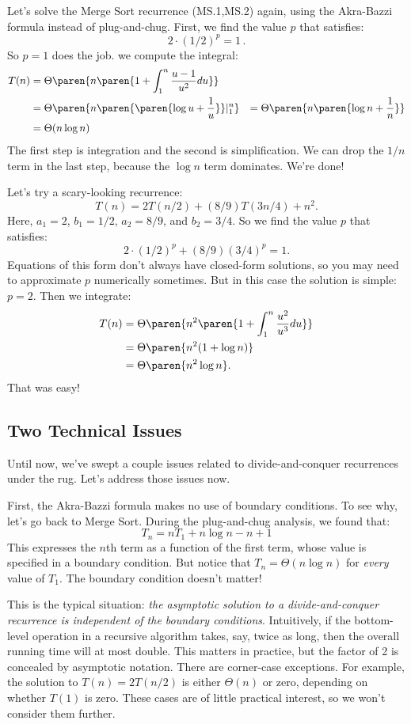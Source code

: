 Let's solve the Merge Sort recurrence (MS.1,MS.2) again, using the
Akra-Bazzi formula instead of plug-and-chug.  First, we find the value
$p$ that satisfies:
\[
2 \cdot (1/2)^p = 1\, .
\]
So $p = 1$ does the job.  
we compute the integral:
\begin{align*}
T(n) & = \Theta\paren{n \paren{1 + \int_1^n \frac{u - 1}{u^2} du}} \\
  & = \Theta\paren{n\paren{\paren{\log u + \frac{1}{u}}}|_1^n}
  & = \Theta\paren{n \paren{\log n + \frac{1}{n}}} \\
  & = \Theta(n\log n)
\end{align*}
The first step is integration and the second is simplification.  We
can drop the $1/n$ term in the last step, because the $\log n$ term
dominates.  We're done!

Let's try a scary-looking recurrence:
\[
T(n) = 2T(n/2) + (8/9)T(3n/4) + n^2.
\]
Here, $a_1 = 2$, $b_1 = 1/2$, $a_2 = 8/9$, and $b_2 = 3/4$.  So we
find the value $p$ that satisfies:
\[
2 \cdot (1/2)^p + (8/9) (3/4)^p = 1.
\]
Equations of this form don't always have closed-form solutions, so you
may need to approximate $p$ numerically sometimes.  But in this case
the solution is simple: $p = 2$.  Then we integrate:
\begin{align*}
T(n) & = \Theta\paren{n^2 \paren{1 + \int_1^n \frac{u^2}{u^3} du}} \\
  & = \Theta\paren{n^2 (1 + \log n)} \\
  & = \Theta\paren{n^2 \log n}.
\end{align*}
That was easy!

\subsection{Two Technical Issues}

Until now, we've swept a couple issues related to divide-and-conquer
recurrences under the rug.  Let's address those issues now.

First, the Akra-Bazzi formula makes no use of boundary conditions.  To
see why, let's go back to Merge Sort.  During the plug-and-chug
analysis, we found that:
\[
T_n = n T_1 + n \log n - n + 1
\]
This expresses the $n$th term as a function of the first term, whose
value is specified in a boundary condition.  But notice that $T_n =
\Theta(n \log n)$ for \emph{every} value of $T_1$.  The boundary
condition doesn't matter!

This is the typical situation: \emph{the asymptotic solution to a
  divide-and-conquer recurrence is independent of the boundary
  conditions}.  Intuitively, if the bottom-level operation in a
recursive algorithm takes, say, twice as long, then the overall
running time will at most double.  This matters in practice, but the
factor of 2 is concealed by asymptotic notation.  There are
corner-case exceptions.  For example, the solution to $T(n) = 2
T(n/2)$ is either $\Theta(n)$ or zero, depending on whether $T(1)$ is
zero.  These cases are of little practical interest, so we won't
consider them further.

